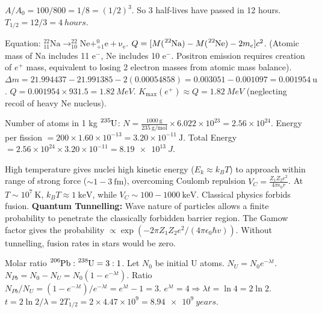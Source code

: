 \documentclass[11pt]{article}
\begin{document}
\begin{corrige}[Exercise 1]
$A/A_0 = 100/800 = 1/8 = (1/2)^3$. So 3 half-lives have passed in 12 hours.
$T_{1/2} = 12 / 3 = \SI{4}{hours}$.
\end{corrige}

\begin{corrige}[Exercise 2]
Equation: $\ensuremath{\mathrm{^{22}_{11}Na \rightarrow  ^{22}_{10}Ne + ^{0}_{+1}e + \nu_e}}$.
$Q = [M(\ce{^{22}Na}) - M(\ce{^{22}Ne}) - 2m_e] c^2$. (Atomic mass of Na includes 11 e$^-$, Ne includes 10 e$^-$. Positron emission requires creation of $e^+$ mass, equivalent to losing 2 electron masses from atomic mass balance).
$\Delta m = 21.994437 - 21.991385 - 2(0.00054858) = 0.003051 - 0.001097 = 0.001954\ \text{u}$.
$Q = 0.001954 \times 931.5 = \SI{1.82}{MeV}$.
$K_{\text{max}}(e^+) \approx Q = \SI{1.82}{MeV}$ (neglecting recoil of heavy Ne nucleus).
\end{corrige}

\begin{corrige}[Exercise 3]
Number of atoms in 1 kg $\ce{^{235}U}$: $N = \frac{1000\ \text{g}}{235\ \text{g/mol}} \times 6.022 \times 10^{23} = 2.56 \times 10^{24}$.
Energy per fission $= 200 \times 1.60 \times 10^{-13} = 3.20 \times 10^{-11}\ \text{J}$.
Total Energy $= 2.56 \times 10^{24} \times 3.20 \times 10^{-11} = \SI{8.19e13}{J}$.
\end{corrige}

\begin{corrige}[Exercise 4]
High temperature gives nuclei high kinetic energy ($E_k \approx k_B T$) to approach within range of strong force ($\sim 1-3\ \text{fm}$), overcoming Coulomb repulsion $V_C = \frac{Z_1 Z_2 e^2}{4\pi\epsilon_0 r}$. At $T \sim 10^7\ \text{K}$, $k_B T \approx 1\ \text{keV}$, while $V_C \sim 100-1000\ \text{keV}$. Classical physics forbids fusion. \textbf{Quantum Tunnelling:} Wave nature of particles allows a finite probability to penetrate the classically forbidden barrier region. The Gamow factor gives the probability $\propto \exp(-2\pi Z_1 Z_2 e^2 / (4\pi\epsilon_0 \hbar v))$. Without tunnelling, fusion rates in stars would be zero.
\end{corrige}

\begin{corrige}[Exercise 5]
Molar ratio $\ce{^{206}Pb} : \ce{^{238}U} = 3:1$.
Let $N_0$ be initial U atoms. $N_U = N_0 e^{-\lambda t}$. $N_{Pb} = N_0 - N_U = N_0(1 - e^{-\lambda t})$.
Ratio $N_{Pb}/N_U = (1 - e^{-\lambda t}) / e^{-\lambda t} = e^{\lambda t} - 1 = 3$.
$e^{\lambda t} = 4 \Rightarrow \lambda t = \ln 4 = 2\ln 2$.
$t = 2 \ln 2 / \lambda = 2 T_{1/2} = 2 \times 4.47 \times 10^9 = \SI{8.94e9}{years}$.
\end{corrige}
\end{document}
